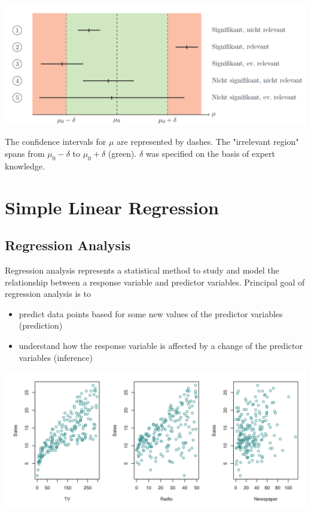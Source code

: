 \documentclass[11pt]{article}
\begin{document}
\begin{center}
	\includegraphics[width=0.95\linewidth]{img/statistical-relevance}
\end{center}
The confidence intervals for $\mu$ are represented by dashes. The "irrelevant region"
spans from $\mu_0 - \delta$ to $\mu_0 + \delta$ (green). $\delta$ was specified on the basis of expert knowledge.

\section{Simple Linear Regression}
\subsection{Regression Analysis}
Regression analysis represents a statistical method to study and model the relationship between a response variable and predictor variables. Principal goal of regression analysis is to
\begin{itemize}[noitemsep]
	\item predict data points based for some new values of the predictor variables (prediction)
	\item understand how the response variable is affected by a change of the predictor variables (inference)
\end{itemize}

\begin{center}
	\includegraphics[width=0.8\linewidth]{img/sales_advertising}
\end{center}
\end{document}
